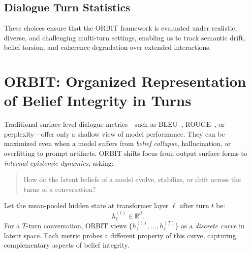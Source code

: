 \documentclass[11pt]{article}
\begin{document}
\subsection*{Dialogue Turn Statistics}

\begin{table}[h!]
\centering
{}
\caption{Average turns per dialogue in selected multi-turn benchmarks.}
\label{tab:dialogue_turns}
\end{table}


These choices ensure that the ORBIT framework is evaluated under realistic, diverse, and challenging multi-turn settings, enabling us to track semantic drift, belief torsion, and coherence degradation over extended interactions.




\section{ORBIT: Organized Representation of Belief Integrity in Turns}

Traditional surface-level dialogue metrics---such as \textsc{BLEU}~\cite{papineni2002bleu}, \textsc{ROUGE}~\cite{lin2004rouge}, or perplexity---offer only a shallow view of model performance. They can be maximized even when a model suffers from \emph{belief collapse}, hallucination, or overfitting to prompt artifacts. ORBIT shifts focus from output surface forms to \emph{internal epistemic dynamics}, asking:
\begin{quote}
How do the latent beliefs of a model evolve, stabilize, or drift across the turns of a conversation?
\end{quote}

Let the mean-pooled hidden state at transformer layer $\ell$ after turn $t$ be:
\[
h_\ell^{(t)} \in \mathbb{R}^d.
\]
For a $T$-turn conversation, ORBIT views $\{h_\ell^{(1)}, \dots, h_\ell^{(T)}\}$ as a \emph{discrete curve} in latent space. Each metric probes a different property of this curve, capturing complementary aspects of belief integrity.
\end{document}
